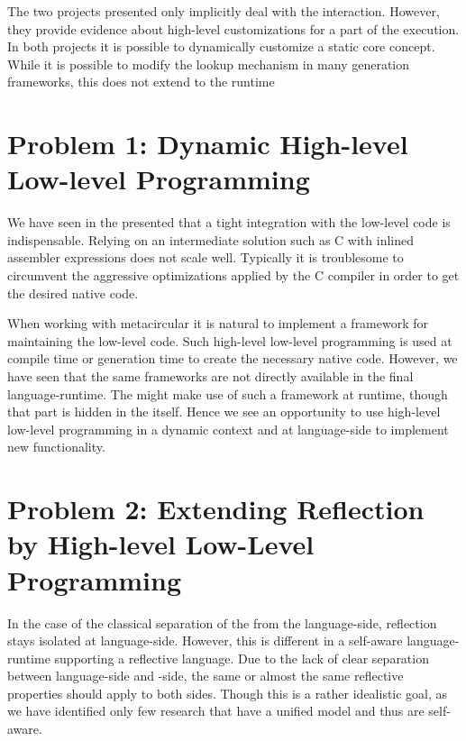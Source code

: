 The two projects presented only implicitly deal with the \JIT interaction.
However, they provide evidence about high-level customizations for a part of the execution.
In both projects it is possible to dynamically customize a static core \VM concept.
While it is possible to modify the lookup mechanism in many \VM generation frameworks, this does not extend to the runtime

\section{Problem 1: Dynamic High-level Low-level Programming}
We have seen in the presented \VMs that a tight integration with the low-level code is indispensable.
Relying on an intermediate solution such as C with inlined assembler expressions does not scale well.
Typically it is troublesome to circumvent the aggressive optimizations applied by the C compiler in order to get the desired native code.

When working with metacircular \VMs it is natural to implement a framework for maintaining the low-level code.
Such high-level low-level programming \cite{Fram09a} is used at compile time or \VM generation time to create the necessary native code.
However, we have seen that the same frameworks are not directly available in the final language-runtime.
The \JIT might make use of such a framework at runtime, though that part is hidden in the \VM itself.
Hence we see an opportunity to use high-level low-level programming in a dynamic context and at language-side to implement new functionality.


\section{Problem 2: Extending Reflection by High-level Low-Level Programming}
In the case of the classical separation of the \VM from the language-side, reflection stays isolated at language-side.
However, this is different in a self-aware language-runtime supporting a reflective language.
Due to the lack of clear separation between language-side and \VM-side, the same or almost the same reflective properties should apply to both sides.
Though this is a rather idealistic goal, as we have identified only few research \VMs that have a unified model and thus are self-aware.


